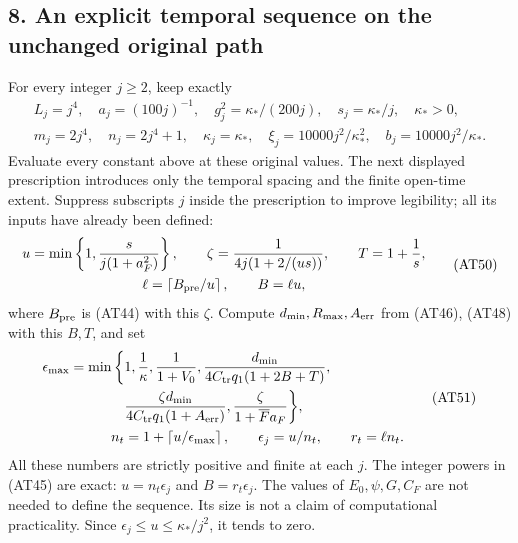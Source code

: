\documentclass[11pt]{article}
\begin{document}
\subsection*{8. An explicit temporal sequence on the unchanged original path}

For every integer \(j\ge2\), keep exactly
\[
 \begin{gathered}
 L_j=j^4,\quad a_j=(100j)^{-1},\quad
 g_j^2=\kappa_*/(200j),\quad s_j=\kappa_*/j,\quad \kappa_*>0,\\
 m_j=2j^4,\quad n_j=2j^4+1,\quad
 \kappa_j=\kappa_*,\quad
 \xi_j=10000j^2/\kappa_*^2,\quad
 b_j=10000j^2/\kappa_* .
 \end{gathered}\tag{AT49}
\]
Evaluate every constant above at these original values. The next displayed prescription introduces only the temporal spacing and the finite open-time extent. Suppress subscripts \(j\) inside the prescription to improve legibility; all its inputs have already been defined:
\[
 \begin{gathered}
 u=\min\left\{1,\frac{s}{j(1+a_F^2)}\right\},\qquad
 \zeta=\frac{1}{4j(1+2/(us))},\qquad T=1+\frac1s,\\
 \ell=\left\lceil B_{\rm pre}/u\right\rceil,\qquad B=\ell u,
 \end{gathered}\tag{AT50}
\]
where \(B_{\rm pre}\) is (AT44) with this \(\zeta\). Compute \(d_{\min},R_{\max},A_{\rm err}\) from (AT46), (AT48) with this \(B,T\), and set
\[
 \begin{aligned}
 \epsilon_{\max}=\min\bigg\{&
 1,\frac1\kappa,\frac1{1+V_0},
 \frac{d_{\min}}{4C_{\rm tr}q_1(1+2B+T)},\\
 &\frac{\zeta d_{\min}}{4C_{\rm tr}q_1(1+A_{\rm err})},
 \frac{\zeta}{1+\overline F a_F}\bigg\},\\
 n_t&=1+\left\lceil u/\epsilon_{\max}\right\rceil,\qquad
 \epsilon_j=u/n_t,\qquad r_t=\ell n_t .
 \end{aligned}\tag{AT51}
\]
All these numbers are strictly positive and finite at each \(j\). The integer powers in (AT45) are exact:
\(u=n_t\epsilon_j\) and \(B=r_t\epsilon_j\).
The values of \(E_0,\psi,G,C_F\) are not needed to define the sequence.
Its size is not a claim of computational practicality.
Since \(\epsilon_j\le u\le\kappa_*/j^2\), it tends to zero.
\end{document}
